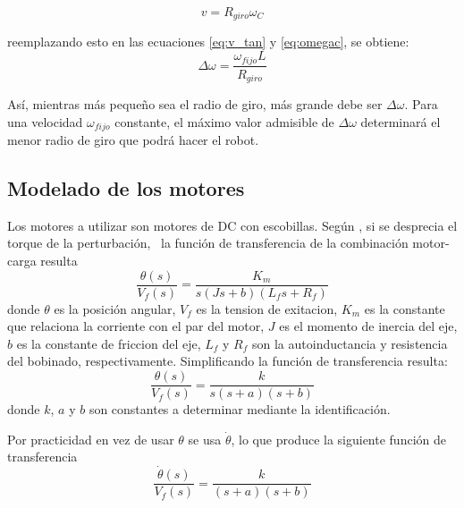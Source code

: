 \documentclass[10pt,conference,a4paper,onecolumn]{article}%
\begin{document}
\begin{equation*}
v=R_{giro} \omega_{C}
\end{equation*}

reemplazando esto en las ecuaciones \ref{eq:v_tan}  y \ref{eq:omegac}, se obtiene:
\begin{equation}
\Delta \omega= \frac{\omega_{fijo}L}{R_{giro}}
\end{equation}

Así, mientras más pequeño sea el radio de giro, más grande debe ser $\Delta \omega$. Para una velocidad $\omega_{fijo}$ constante, el máximo valor admisible de $\Delta \omega$ determinará el menor radio de giro que podrá hacer el robot.

 \subsection{Modelado de los motores}
 \label{modeloMotores}
 
 Los motores a utilizar son motores de DC con escobillas. Según \cite[pág. 58-59]{dorf}, si se desprecia el torque de la perturbación,%
\ la función de transferencia de la combinación motor-carga resulta
 \begin{equation*}
 \frac{\theta(s)}{V_f(s)}=\frac{K_m}{s(Js+b)(L_fs+R_f)}
 \end{equation*}
 donde $\theta$ es la posición angular, $V_f$ es la tension de exitacion, $K_m$ es la constante que relaciona la corriente con el par del motor, $J$ es el momento de inercia del eje, $b$ es la constante de friccion del eje, $L_f$  y $R_f$ son la autoinductancia y resistencia del bobinado, respectivamente. Simplificando la función de transferencia resulta:
 \begin{equation*}
 \frac{\theta(s)}{V_f(s)}=\frac{k}{s(s+a)(s+b)}
 \end{equation*}
 donde $k$, $a$ y $b$ son constantes a determinar mediante la identificación.
 
Por practicidad en vez de usar $\theta$ se usa $\dot{\theta}$, lo que produce la siguiente función de transferencia
 \begin{equation}
 \frac{\dot{\theta}(s)}{V_f(s)}=\frac{k}{(s+a)(s+b)}
 \end{equation}
  
\end{document}
